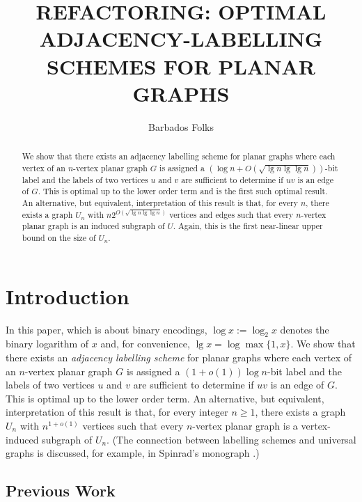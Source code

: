 \documentclass[kpfonts]{patmorin}
\title{\MakeUppercase{Refactoring: Optimal Adjacency-Labelling Schemes for Planar Graphs}}
\author{Barbados Folks}
\begin{document}
\begin{titlepage}
\maketitle

\begin{abstract}
  We show that there exists an adjacency labelling scheme for planar graphs where each vertex of an $n$-vertex planar graph $G$ is assigned a $(\log n+O(\sqrt{\lg n\lg\lg n}))$-bit label and the labels of two vertices $u$ and $v$ are sufficient to determine if $uv$ is an edge of $G$.  This is optimal up to the lower order term and is the first such optimal result.  An alternative, but equivalent, interpretation of this result is that, for every $n$, there exists a graph $U_n$ with $n2^{O(\sqrt{\lg n\lg\lg n})}$ vertices and edges such that every $n$-vertex planar graph is an induced subgraph of $U$.  Again, this is the first near-linear upper bound on the size of $U_n$.
\end{abstract}
\end{titlepage}
\tableofcontents

\newpage

\setcounter{page}{0}
\section{Introduction}

In this paper, which is about binary encodings, $\log x:=\log_2 x$ denotes the binary logarithm of $x$ and, for convenience, $\lg x = \log\max\{1,x\}$.  We show that there exists an \emph{adjacency labelling scheme} for planar graphs where each vertex of an $n$-vertex planar graph $G$ is assigned a $(1+o(1))\log n$-bit label and the labels of two vertices $u$ and $v$ are sufficient to determine if $uv$ is an edge of $G$.  This is optimal up to the lower order term.  An alternative, but equivalent, interpretation of this result is that, for every integer $n\ge 1$, there exists a graph $U_n$ with $n^{1+o(1)}$  vertices such that every $n$-vertex planar graph is a vertex-induced subgraph of $U_n$.  (The connection between labelling schemes and universal graphs is discussed, for example, in Spinrad's monograph \cite[Section~2.1]{spinrad:efficient}.) 

\subsection{Previous Work}
\end{document}
